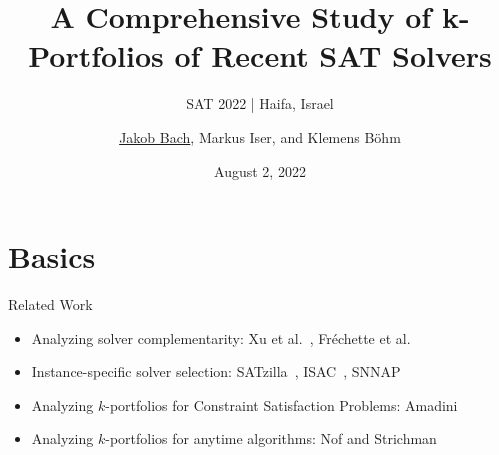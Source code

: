\documentclass[en]{sdqbeamer}
\title[A Comprehensive Study of k-Portfolios of Recent SAT Solvers]{A Comprehensive Study of k-Portfolios of Recent SAT Solvers} %
\subtitle{SAT 2022 | Haifa, Israel}
\author[\underline{Jakob Bach}, Markus Iser, and Klemens Böhm]{\underline{Jakob Bach}, Markus Iser, and Klemens Böhm} %
\date[2022-08-02]{August 2, 2022} %
\begin{document}
\KITtitleframe

\section{Basics}

\begin{frame}[t]{Related Work}
	\begin{itemize}
		\item Analyzing solver complementarity: Xu et al.~\cite{Xu:2012:EvalContribVBS}, Fr{\'e}chette et al.~\cite{frechette2016using}
		\pause
		\vspace{\baselineskip}
		\item Instance-specific solver selection: SATzilla~\cite{xu2008satzilla, xu2012satzilla2012}, ISAC~\cite{Kadioglu:2010:ISAC}, SNNAP~\cite{Collautti:2013:SNNAP}
		\pause
		\vspace{\baselineskip}
		\item Analyzing $k$-portfolios for Constraint Satisfaction Problems: Amadini~\cite{amadini2014empirical, amadini2016extensive}
		\pause
		\vspace{\baselineskip}
		\item Analyzing $k$-portfolios for anytime algorithms: Nof and Strichman~\cite{nof2020real}
	\end{itemize}
\end{frame}
\end{document}
